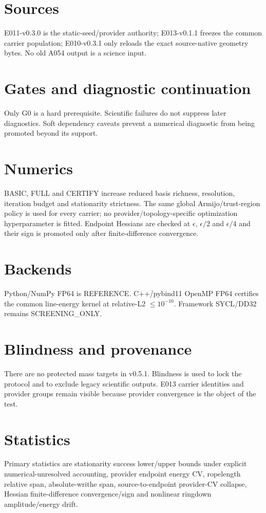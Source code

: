 \documentclass[11pt]{article}
\begin{document}
\section{Sources}
E011-v0.3.0 is the static-seed/provider authority; E013-v0.1.1 freezes the common carrier population; E010-v0.3.1 only reloads the exact source-native geometry bytes. No old A054 output is a science input.
\section{Gates and diagnostic continuation}
Only G0 is a hard prerequisite. Scientific failures do not suppress later diagnostics. Soft dependency caveats prevent a numerical diagnostic from being promoted beyond its support.
\section{Numerics}
BASIC, FULL and CERTIFY increase reduced basis richness, resolution, iteration budget and stationarity strictness. The same global Armijo/trust-region policy is used for every carrier; no provider/topology-specific optimization hyperparameter is fitted. Endpoint Hessians are checked at $\epsilon$, $\epsilon/2$ and $\epsilon/4$ and their sign is promoted only after finite-difference convergence.
\section{Backends}
Python/NumPy FP64 is REFERENCE. C++/pybind11 OpenMP FP64 certifies the common line-energy kernel at relative-L2 $\le10^{-10}$. Framework SYCL/DD32 remains SCREENING\_ONLY.
\section{Blindness and provenance}
There are no protected mass targets in v0.5.1. Blindness is used to lock the protocol and to exclude legacy scientific outputs. E013 carrier identities and provider groups remain visible because provider convergence is the object of the test.
\section{Statistics}
Primary statistics are stationarity success lower/upper bounds under explicit numerical-unresolved accounting, provider endpoint energy CV, ropelength relative span, absolute-writhe span, source-to-endpoint provider-CV collapse, Hessian finite-difference convergence/sign and nonlinear ringdown amplitude/energy drift.
\end{document}
